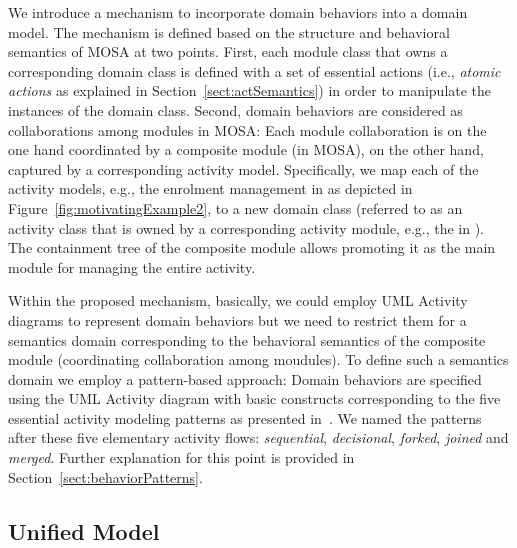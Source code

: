 We introduce a mechanism to incorporate domain behaviors into a domain model. The mechanism is defined based on the structure and behavioral semantics of MOSA at two points. %
%
First, each module class that owns a corresponding domain class  is defined with a set of essential actions (i.e., \textit{atomic actions} as explained in Section~\ref{sect:actSemantics}) in order to manipulate the instances of the domain class. %
%
Second, domain behaviors are considered as collaborations among modules in MOSA: Each module collaboration is on the one hand coordinated by a composite module (in MOSA), on the other hand, captured by a corresponding activity model. Specifically, we map each of the activity models, e.g., the enrolment management in \courseman as depicted in Figure~\ref{fig:motivatingExample2}, to a new domain class (referred to as an activity class that is owned by a corresponding activity module, e.g., the  in \courseman). The containment tree of the composite module allows promoting it as the main module for managing the entire activity.

Within the proposed mechanism, basically, we could employ UML Activity diagrams to represent domain behaviors but we need to restrict them for a semantics domain corresponding to the behavioral semantics of the composite module (coordinating collaboration among moudules). To define such a semantics domain we employ a pattern-based approach: Domain behaviors are specified using the UML Activity diagram with basic constructs corresponding to the five essential activity modeling patterns as presented in~\cite{le_domain_2018}. We named the patterns after these five elementary activity flows: \textit{sequential}, \textit{decisional}, \textit{forked}, \textit{joined} and \textit{merged}. Further explanation for this point is provided in Section~\ref{sect:behaviorPatterns}.

\subsection{Unified Model}
\label{subsect:unifiedModel}

